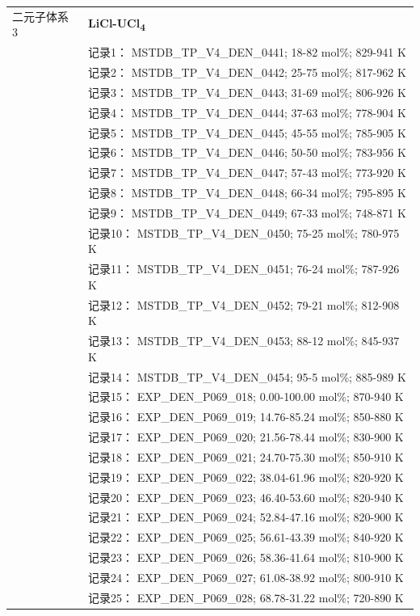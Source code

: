 \documentclass[12pt]{article}
\begin{document}
{\begin{longtable}[]{@{}
  >{\raggedright\arraybackslash}p{}
  >{\raggedright\arraybackslash}p{}@{}}
二元子体系 3  & \textbf{LiCl-UCl\textsubscript{4}} \\
 & 记录1： MSTDB\_TP\_V4\_DEN\_0441; 18-82 mol\%; 829-941 K \\
 & 记录2： MSTDB\_TP\_V4\_DEN\_0442; 25-75 mol\%; 817-962 K \\
 & 记录3： MSTDB\_TP\_V4\_DEN\_0443; 31-69 mol\%; 806-926 K \\
 & 记录4： MSTDB\_TP\_V4\_DEN\_0444; 37-63 mol\%; 778-904 K \\
 & 记录5： MSTDB\_TP\_V4\_DEN\_0445; 45-55 mol\%; 785-905 K \\
 & 记录6： MSTDB\_TP\_V4\_DEN\_0446; 50-50 mol\%; 783-956 K \\
 & 记录7： MSTDB\_TP\_V4\_DEN\_0447; 57-43 mol\%; 773-920 K \\
 & 记录8： MSTDB\_TP\_V4\_DEN\_0448; 66-34 mol\%; 795-895 K \\
 & 记录9： MSTDB\_TP\_V4\_DEN\_0449; 67-33 mol\%; 748-871 K \\
 & 记录10： MSTDB\_TP\_V4\_DEN\_0450; 75-25 mol\%; 780-975 K \\
 & 记录11： MSTDB\_TP\_V4\_DEN\_0451; 76-24 mol\%; 787-926 K \\
 & 记录12： MSTDB\_TP\_V4\_DEN\_0452; 79-21 mol\%; 812-908 K \\
 & 记录13： MSTDB\_TP\_V4\_DEN\_0453; 88-12 mol\%; 845-937 K \\
 & 记录14： MSTDB\_TP\_V4\_DEN\_0454; 95-5 mol\%; 885-989 K \\
 & 记录15： EXP\_DEN\_P069\_018; 0.00-100.00 mol\%; 870-940 K \\
 & 记录16： EXP\_DEN\_P069\_019; 14.76-85.24 mol\%; 850-880 K \\
 & 记录17： EXP\_DEN\_P069\_020; 21.56-78.44 mol\%; 830-900 K \\
 & 记录18： EXP\_DEN\_P069\_021; 24.70-75.30 mol\%; 850-910 K \\
 & 记录19： EXP\_DEN\_P069\_022; 38.04-61.96 mol\%; 820-920 K \\
 & 记录20： EXP\_DEN\_P069\_023; 46.40-53.60 mol\%; 820-940 K \\
 & 记录21： EXP\_DEN\_P069\_024; 52.84-47.16 mol\%; 820-900 K \\
 & 记录22： EXP\_DEN\_P069\_025; 56.61-43.39 mol\%; 840-920 K \\
 & 记录23： EXP\_DEN\_P069\_026; 58.36-41.64 mol\%; 810-900 K \\
 & 记录24： EXP\_DEN\_P069\_027; 61.08-38.92 mol\%; 800-910 K \\
 & 记录25： EXP\_DEN\_P069\_028; 68.78-31.22 mol\%; 720-890 K \\

\end{longtable}}
\end{document}
